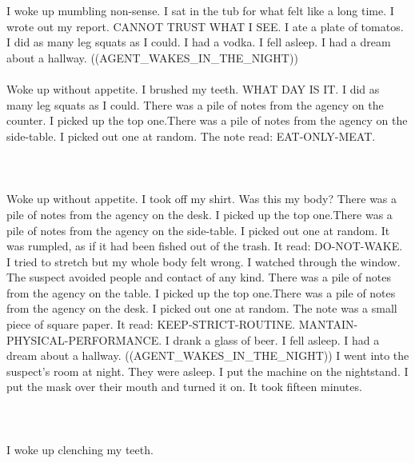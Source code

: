 \documentclass{article}
\begin{document}
    \section{}
    I woke up mumbling non-sense. I sat in the tub for what felt like a long time. I wrote out my report. CANNOT TRUST WHAT I SEE. I ate a plate of tomatos. I did as many leg squats as I could. I had a vodka. I fell asleep. I had a dream about a hallway. ((AGENT_WAKES_IN_THE_NIGHT)) \\\\Woke up without appetite. I brushed my teeth. WHAT DAY IS IT. I did as many leg squats as I could. There was a pile of notes from the agency on the counter. I picked up the top one.There was a pile of notes from the agency on the side-table. I picked out one at random. The note read: EAT-ONLY-MEAT. \\\\
    \newpage
    
    \section{}
    Woke up without appetite. I took off my shirt. Was this my body? There was a pile of notes from the agency on the desk. I picked up the top one.There was a pile of notes from the agency on the side-table. I picked out one at random. It was rumpled, as if it had been fished out of the trash. It read: DO-NOT-WAKE. I tried to stretch but my whole body felt wrong. I watched through the window. The suspect avoided people and contact of any kind. There was a pile of notes from the agency on the table. I picked up the top one.There was a pile of notes from the agency on the desk. I picked out one at random. The note was a small piece of square paper. It read: KEEP-STRICT-ROUTINE. MANTAIN-PHYSICAL-PERFORMANCE. I drank a glass of beer. I fell asleep. I had a dream about a hallway. ((AGENT_WAKES_IN_THE_NIGHT)) I went into the suspect's room at night. They were asleep. I put the machine on the nightstand. I put the mask over their mouth and turned it on. It took fifteen minutes. \\\\
    \newpage
    
    \section{}
    I woke up clenching my teeth.\\\\ 
    \newpage
    
\end{document}
